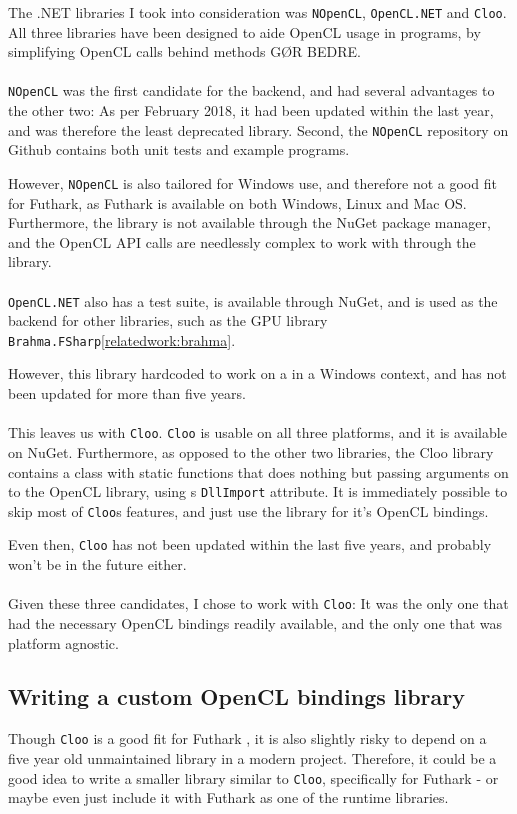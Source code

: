 The .NET libraries I took into consideration was \texttt{NOpenCL}, \texttt{OpenCL.NET} and \texttt{Cloo}.
All three libraries have been designed to aide OpenCL usage in \csharp{}
programs, by simplifying OpenCL calls behind methods GØR BEDRE.
\\
\\
\texttt{NOpenCL} was the first candidate for the \csharp{} backend, and had
several advantages to the other two: As per February 2018, it had been updated
within the last year, and was therefore the least deprecated library. Second,
the \texttt{NOpenCL} repository on Github contains both unit tests and
example programs.

However, \texttt{NOpenCL} is also tailored for Windows use, and therefore not a
good fit for Futhark, as Futhark is available on both Windows, Linux and Mac OS.
Furthermore, the library is not available through the NuGet
package manager, and the OpenCL API calls are needlessly complex to work with
through the library.
\\
\\
\texttt{OpenCL.NET} also has a test suite, is available through NuGet, and is
used as the backend for other libraries, such as the \fsharp{} GPU library
\texttt{Brahma.FSharp}\ref{relatedwork:brahma}.

However, this library hardcoded to work on a in a Windows context, and has not been
updated for more than five years.
\\
\\
This leaves us with \texttt{Cloo}. \texttt{Cloo} is usable on all three
platforms, and it is available on NuGet. Furthermore, as opposed to the other two libraries, the
Cloo library contains a class with static functions that does nothing but
passing arguments on to the OpenCL library, using \csharp{}s \texttt{DllImport}
attribute. It is immediately possible to skip most of \texttt{Cloo}s features,
and just use the library for it's OpenCL bindings.

Even then, \texttt{Cloo} has not been updated within the last five years, and
probably won't be in the future either.
\\
\\
Given these three candidates, I chose to work with \texttt{Cloo}: It was the
only one that had the necessary OpenCL bindings readily available, and the only
one that was platform agnostic.

\subsection*{Writing a custom OpenCL bindings library}
Though \texttt{Cloo} is a good fit for Futhark \csharp{}, it is also slightly
risky to depend on a five year old unmaintained library in a modern project.
Therefore, it could be a good idea to write a smaller library similar to
\texttt{Cloo}, specifically for Futhark - or maybe even just include it with
Futhark as one of the \csharp{} runtime libraries. 

